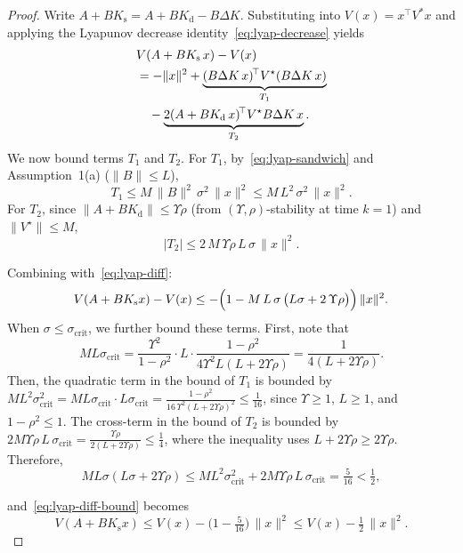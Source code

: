\documentclass[letterpaper, 10pt, conference]{ieeeconf}
\begin{document}
\begin{proof}

Write $A+BK_{\mathrm{s}}
  = A+BK_{\mathrm{d}} - B\Delta K$.
Substituting into
$V(x) = x^\top V^* x$ and applying
the Lyapunov decrease
identity~\eqref{eq:lyap-decrease} yields
\begin{align}
  &V(A+BK_{\mathrm{s}}\,x) - V(x)
  \notag\\
  &= -\|x\|^{2}
     + \underbrace{(B\Delta K\,x)^{\!\top}
       V^{\star}(B\Delta K\,x)}_{T_{1}}
  \notag\\
  &\quad
     - \underbrace{2(A+BK_{\mathrm{d}}\,x)^{\!\top}
       V^{\star} B\Delta K\,x}_{T_{2}}.
  \label{eq:lyap-diff}
\end{align}
We now bound terms $T_1$ and $T_2$. For $T_1$, by~\eqref{eq:lyap-sandwich} and Assumption~1(a)
($\|B\| \le L$),
\[
  T_{1} \le M\,\|B\|^{2}\,\sigma^{2}\,\|x\|^{2}
       \le M\, L^{2}\,\sigma^{2}\,\|x\|^{2}.
\]
For $T_2$, since $\|A+BK_{\mathrm{d}}\| \le \Upsilon\rho$
(from $(\Upsilon,\rho)$-stability at time $k=1$) and
$\|V^{\star}\| \le M$,
\[
  |T_{2}| \le 2\,M\,\Upsilon\rho\,L\,\sigma\,\|x\|^{2}.
\]

Combining with~\eqref{eq:lyap-diff}:
\begin{equation}\label{eq:lyap-diff-bound}
  V(A+BK_{\mathrm{s}} x) - V(x)
  \le -\Bigl(1 - M\,L\,\sigma\,
       \bigl(L\sigma + 2\,\Upsilon\rho\bigr)\Bigr)\,\|x\|^{2}.
\end{equation}
When $\sigma \le \sigma_{\mathrm{crit}}$, we further bound these terms. First, note that
\[
  M L \sigma_{\mathrm{crit}}
  = \frac{\Upsilon^{2}}{1-\rho^{2}} \cdot L \cdot
    \frac{1-\rho^{2}}{4\Upsilon^{2} L(L+2\Upsilon\rho)}
  = \frac{1}{4(L+2\Upsilon\rho)}.
\]
Then, the quadratic term in the bound of $T_1$ is bounded by
$M L^{2} \sigma_{\mathrm{crit}}^{2}
  = M L \sigma_{\mathrm{crit}} \cdot L\sigma_{\mathrm{crit}}
  = \frac{1-\rho^{2}}
         {16\,\Upsilon^{2}(L + 2\Upsilon\rho)^{2}}
  \le \frac{1}{16}$,
since $\Upsilon \ge 1$, $L \ge 1$, and $1-\rho^{2} \le 1$.
The cross-term in the bound of $T_2$ is bounded by  $2 M \Upsilon\rho\, L\, \sigma_{\mathrm{crit}}
  = \frac{\Upsilon\rho}{2(L + 2\Upsilon\rho)}
  \le \frac{1}{4}$,
where the inequality uses $L + 2\Upsilon\rho \ge 2\Upsilon\rho$.
Therefore,
\[
  M L \sigma(L\sigma + 2\Upsilon\rho)
  \le M L^{2} \sigma_{\mathrm{crit}}^{2}
      + 2 M \Upsilon\rho\, L\, \sigma_{\mathrm{crit}} 
  = \tfrac{5}{16}
  < \tfrac{1}{2},
\]

and~\eqref{eq:lyap-diff-bound} becomes
\begin{equation}\label{eq:lyap-half}
  V(A+BK_{\mathrm{s}} x)
  \le V(x) - \bigl(1 - \tfrac{5}{16}\bigr)\,\|x\|^{2}
  \le V(x) - \tfrac{1}{2}\,\|x\|^{2}.
\end{equation}


\end{proof}
\end{document}
